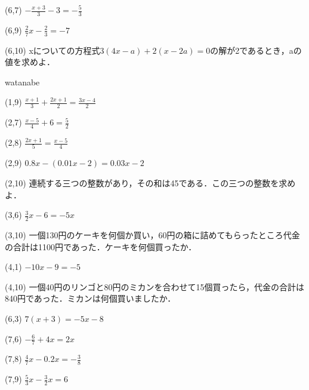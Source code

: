\documentclass[a4paper,fleqn,papersize,15pt]{jsarticle}
\begin{document}
(6,7)  \large     $- \frac{x+3}{3} -3 = - \frac{5}{3}$

(6,9)  \large     $\frac{2}{7}x - \frac{2}{3} = -7$

(6,10)  \large     xについての方程式$3(4x-a)+2(x-2a)=0$の解が2であるとき，aの値を求めよ．

\clearpage
watanabe

 (1,9)  \large     $\frac{x+1}{3} +\frac{2x+1}{2} = \frac{3x-4}{2}$

(2,7)  \large     $\frac{x-5}{4} + 6 = \frac{5}{2}$

(2,8)  \large     $\frac{2x+1}{5}  = \frac{x-5}{4}$

(2,9)  \large     $0.8x-(0.01x-2) = 0.03x-2$

(2,10)  \large     連続する三つの整数があり，その和は45である．この三つの整数を求めよ．

(3,6)  \large     $\frac{3}{2}x -6 = -5x$

(3,10)  \large     一個130円のケーキを何個か買い，60円の箱に詰めてもらったところ代金の合計は1100円であった．ケーキを何個買ったか．

(4,1)  \large     $-10x - 9 = -5$

(4,10)  \large     一個40円のリンゴと80円のミカンを合わせて15個買ったら，代金の合計は840円であった．ミカンは何個買いましたか．

(6,3)  \large     $7(x + 3) = -5x -8$

(7,6)  \large     $- \frac{6}{7} + 4x = 2x$

(7,8)  \large     $\frac{4}{7}x -0.2x = - \frac{3}{8}$

(7,9)  \large     $\frac{5}{3}x - \frac{3}{2}x = 6$

\clearpage

        
\end{document}
